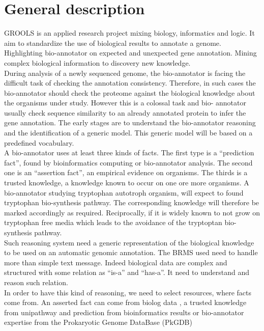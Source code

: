 \documentclass{llncs}
\begin{document}
\section{General description}
GROOLS is an applied research project mixing  biology, informatics and logic. It aim to standardize the use of biological results to annotate a genome. Highlighting bio-annotator on expected and unexpected gene annotation. Mining complex biological information to discovery new knowledge.\\
During analysis of a newly sequenced genome, the bio-annotator is facing the difficult task of checking the annotation consistency. Therefore, in such cases the bio-annotator should check the proteome against the biological knowledge about the organisms under study. However this is a colossal task and bio- annotator usually check sequence similarity to an already annotated protein to infer the gene annotation. The early stages are to understand the bio-annotator reasoning and the identification of a generic model. This generic model will be based on a predefined vocabulary.\\
A bio-annotator uses at least three kinds of facts. The first type is a ``prediction fact'', found by bioinformatics computing or bio-annotator analysis. The second one is an ``assertion fact'', an empirical evidence on organisms. The thirds is a trusted knowledge, a knowledge known to occur on one ore more organisms. A bio-annotator studying tryptophan autotroph organism,  will expect to found tryptophan bio-synthesis pathway. The corresponding knowledge will therefore be marked accordingly as required. Reciprocally, if it is widely known to not grow on tryptophan free media which leads to the avoidance of the tryptoptan bio-synthesis pathway. \\
Such reasoning system need a generic representation of the biological knowledge to be used on an automatic genomic annotation. The BRMS used need to handle more than simple text message. Indeed biological data are complex and structured with some relation as ``is-a'' and ``has-a''. It need to understand and reason such relation. \\
In order to have this kind of reasoning, we need to select resources, where facts come from. An asserted fact can come from biolog data \cite{biolog}, a trusted knowledge from unipathway \cite{morgat2011unipathway} and prediction from bioinformatics results or bio-annotator expertise from the Prokaryotic Genome DataBase (PkGDB) \cite{vallenet2012microscope} \\
\end{document}
